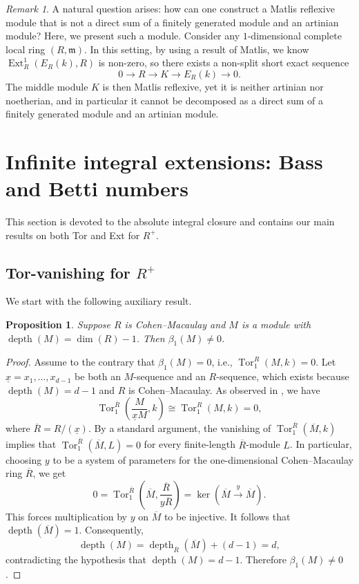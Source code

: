 \documentclass[11pt,a4paper]{amsart}
\numberwithin{equation}{section}
\newtheorem{proposition}[theorem]{Proposition}
\theoremstyle{definition}
\theoremstyle{remark}
\newtheorem{remark}[theorem]{Remark}
\newcommand{\depth}{\operatorname{depth}}
\begin{document}
\begin{remark}
	A natural question arises: how can one construct a Matlis reflexive module that is not a direct sum of a finitely generated module and an artinian module? Here, we present such a module. Consider any \(1\)-dimensional complete local ring \((R,\mathfrak{m})\). In this setting, by using a result of Matlis, we know \(\operatorname{Ext}^1_R(E_R(k), R)\) is non-zero, so there exists a non-split short exact sequence
	\[
	0 \longrightarrow R \longrightarrow K \longrightarrow E_R(k) \longrightarrow 0.
	\]
	The middle module \(K\) is then Matlis reflexive, yet it is neither artinian nor noetherian, and in particular it cannot be decomposed as a direct sum of a finitely generated module and an artinian module.
\end{remark}


\section{Infinite  integral extensions: Bass and Betti numbers}
	
This section is devoted to the absolute integral closure and contains our main results on both Tor and Ext for \(R^+\).
	
\subsection{Tor-vanishing for \(R^+\)}
We start with the following auxiliary result.

\begin{proposition}
	Suppose \(R\) is Cohen--Macaulay and \(M\) is a module with \(\depth(M) = \dim(R) - 1\). Then \(\beta_1(M) \neq 0\).
\end{proposition}

\begin{proof}
	Assume to the contrary that \(\beta_1(M) = 0\), i.e., \(\operatorname{Tor}_1^R(M, k) = 0\). Let \(\underline{x} = x_1, \dots, x_{d-1}\) be both an \(M\)-sequence and an \(R\)-sequence, which exists because \(\depth(M) = d - 1\) and \(R\) is Cohen--Macaulay. As observed in \cite[Lemma 2.1]{sc1}, we have
	\[
	\operatorname{Tor}_1^{\overline{R}}\!\left(\frac{M}{\underline{x}M}, k\right) \cong \operatorname{Tor}_1^R(M, k) = 0,
	\]
	where \(\overline{R} = R/(\underline{x})\). By a standard argument, the vanishing of \(\operatorname{Tor}_1^{\overline{R}}(\overline{M}, k)\) implies that
	\(
	\operatorname{Tor}_1^{\overline{R}}(\overline{M}, L) = 0
	\)
	for every finite-length \(\overline{R}\)-module \(L\). In particular, choosing \(y\) to be a system of parameters for the one-dimensional Cohen--Macaulay ring \(\overline{R}\), we get
	\[
	0 = \operatorname{Tor}_1^{\overline{R}}\!\left(\overline{M}, \frac{\overline{R}}{y\overline{R}}\right) = \ker\left(\overline{M} \xrightarrow{y} \overline{M}\right).
	\]
	This forces multiplication by \(y\) on \(\overline{M}\) to be injective. It follows that \(\depth(\overline{M}) = 1\). Consequently,
	\[
	\depth(M) = \depth_{\overline{R}}(\overline{M}) + (d - 1) = d,
	\]
	contradicting the hypothesis that \(\depth(M) = d - 1\). Therefore \(\beta_1(M) \neq 0\).
\end{proof}
\end{document}
